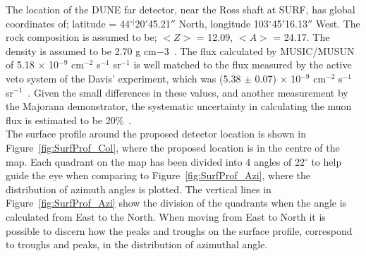 The location of the DUNE far detector, near the Ross shaft at SURF, has global coordinates of; latitude = 44$^{\circ|}$20$'$45.21$''$ North, longitude 103$^{\circ}$45$'$16.13$''$ West. The rock composition is assumed to be; $< Z >$ = 12.09, $< A >$ = 24.17. The density is assumed to be 2.70 g cm${-3}$~\citep{Mei:2009py}. The flux calculated by MUSIC/MUSUN of 5.18 $\times$ 10$^{-9}$ cm$^{-2}$ s$^{-1}$ sr$^{-1}$ is well matched to the flux measured by the active veto system of the Davis' experiment, which was (5.38 $\pm$ 0.07) $\times$ 10$^{-9}$ cm$^{-2}$ s$^{-1}$ sr$^{-1}$~\citep{PhysRevD.27.1444}. Given the small differences in these values, and another measurement by the Majorana demonstrator, the systematic uncertainty in calculating the muon flux is estimated to be 20\%~\citep{NDKTFNote}. \\

The surface profile around the proposed detector location is shown in Figure~\ref{fig:SurfProf_Col}, where the proposed location is in the centre of the map. Each quadrant on the map has been divided into 4 angles of 22$^{\circ}$ to help guide the eye when comparing to Figure~\ref{fig:SurfProf_Azi}, where the distribution of azimuth angles is plotted. The vertical lines in Figure~\ref{fig:SurfProf_Azi} show the division of the quadrants when the angle is calculated from East to the North. When moving from East to North it is possible to discern how the peaks and troughs on the surface profile, correspond to troughs and peaks, in the distribution of azimuthal angle. \\


